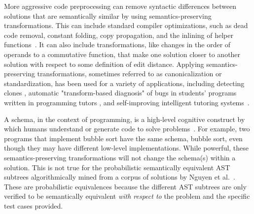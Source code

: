 
More aggressive code preprocessing can remove syntactic differences between solutions that are semantically similar by using semantics-preserving transformations. This can include standard compiler optimizations, such as dead code removal, constant folding, copy propagation, and the inlining of helper functions~\cite{rivers2015data}. It can also include transformations, like changes in the order of operands to a commutative function, that make one solution closer to another solution with respect to some definition of edit distance. Applying semantics-preserving transformations, sometimes referred to as canonicalization or standardization, has been used for a variety of applications, including detecting clones \cite{baxter,CCFinder}, automatic "transform-based diagnosis" of bugs in students' programs written in programming tutors \cite{xutransformation}, and self-improving intelligent tutoring systems~\cite{rivers2015data}. 

A schema, in the context of programming, is a high-level cognitive construct by which humans understand or generate code to solve problems~\cite{Soloway1984}. For example, two programs that implement bubble sort have the same schema, bubble sort, even though they may have different low-level implementations. While powerful, these semantics-preserving transformations will not change the schema(s) within a solution. This is not true for the probabilistic semantically equivalent AST subtrees algorithmically mined from a corpus of solutions by Nguyen et al.~\cite{codewebs}. These are probabilistic equivalences because the different AST subtrees are only verified to be semantically equivalent {\it with respect to} the problem and the specific test cases provided. 


